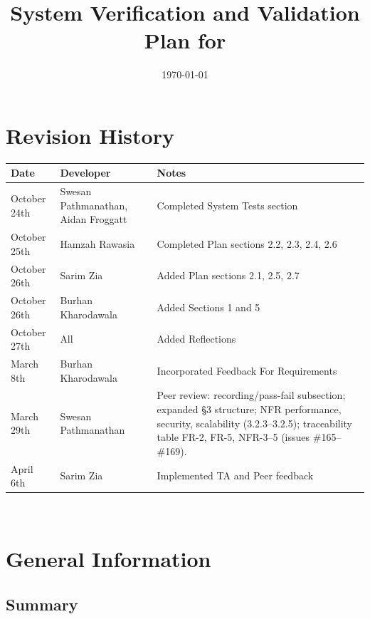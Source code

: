 \documentclass[12pt, titlepage]{article}
\begin{document}
\title{System Verification and Validation Plan for \progname{}} 
\author{\authname}
\date{\today}
	
\maketitle


\section*{Revision History}

\begin{tabularx}{\textwidth}{llX}
\toprule {\bf Date} & {\bf Developer} & {\bf Notes}\\
\midrule
October 24th & Swesan Pathmanathan, Aidan Froggatt & Completed System Tests section\\
October 25th & Hamzah Rawasia & Completed Plan sections 2.2, 2.3, 2.4, 2.6\\
October 26th & Sarim Zia & Added Plan sections 2.1, 2.5, 2.7\\
October 26th & Burhan Kharodawala & Added Sections 1 and 5\\
October 27th & All & Added Reflections \\
March 8th & Burhan Kharodawala & Incorporated Feedback For Requirements\\
March 29th & Swesan Pathmanathan & Peer review: recording/pass-fail subsection; expanded \S3 structure; NFR performance, security, scalability (3.2.3--3.2.5); traceability table FR-2, FR-5, NFR-3--5 (issues \#165--\#169).\\
April 6th & Sarim Zia & Implemented TA and Peer feedback \\

\bottomrule
\end{tabularx}

~\\

\newpage

\tableofcontents

\newpage



\section{General Information}

\subsection{Summary}
\end{document}
